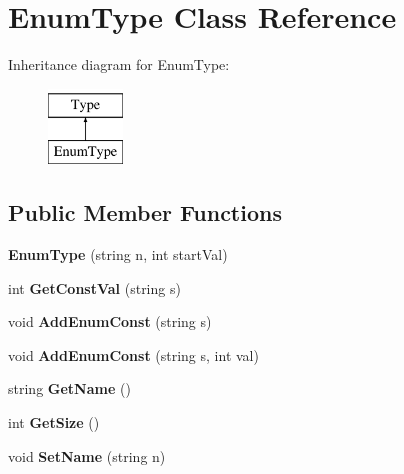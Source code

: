 \hypertarget{classEnumType}{\section{Enum\-Type Class Reference}
\label{classEnumType}
}
Inheritance diagram for Enum\-Type\-:\begin{figure}[H]
\begin{center}
\leavevmode
\includegraphics[height=2.000000cm]{classEnumType}
\end{center}
\end{figure}
\subsection*{Public Member Functions}
\begin{DoxyCompactItemize}
\item 
\hypertarget{classEnumType_ae7c41f665f312e82e0c50614726ef6e1}{{\bfseries Enum\-Type} (string n, int start\-Val)}\label{classEnumType_ae7c41f665f312e82e0c50614726ef6e1}

\item 
\hypertarget{classEnumType_a4011034b4e53b36addbefbcf1bf93121}{int {\bfseries Get\-Const\-Val} (string s)}\label{classEnumType_a4011034b4e53b36addbefbcf1bf93121}

\item 
\hypertarget{classEnumType_aeebf9ff85428ac5804ba7939c8c227e7}{void {\bfseries Add\-Enum\-Const} (string s)}\label{classEnumType_aeebf9ff85428ac5804ba7939c8c227e7}

\item 
\hypertarget{classEnumType_a161ca3b2bbad063c616813f0cfb23812}{void {\bfseries Add\-Enum\-Const} (string s, int val)}\label{classEnumType_a161ca3b2bbad063c616813f0cfb23812}

\item 
\hypertarget{classType_a8143fe4686ae1a5709a5955396c6ee26}{string {\bfseries Get\-Name} ()}\label{classType_a8143fe4686ae1a5709a5955396c6ee26}

\item 
\hypertarget{classType_afe0fca035825759785b525d2a24f69fe}{int {\bfseries Get\-Size} ()}\label{classType_afe0fca035825759785b525d2a24f69fe}

\item 
\hypertarget{classType_ab8d2328a3a76289edf42b9bf0d4f278f}{void {\bfseries Set\-Name} (string n)}\label{classType_ab8d2328a3a76289edf42b9bf0d4f278f}

\end{DoxyCompactItemize}
